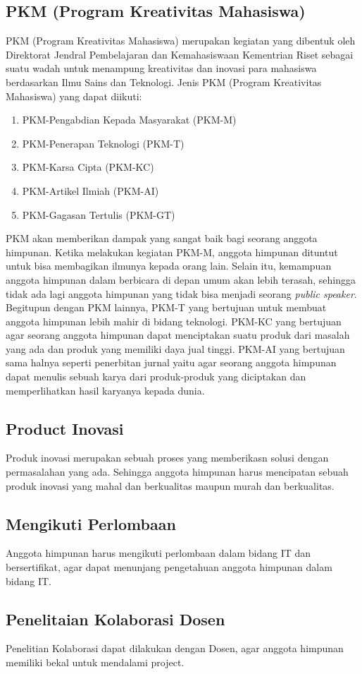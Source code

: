 \subsection{PKM (Program Kreativitas Mahasiswa)}
\par
PKM (Program Kreativitas Mahasiswa) merupakan kegiatan yang dibentuk oleh Direktorat Jendral Pembelajaran dan Kemahasiswaan Kementrian Riset sebagai suatu wadah untuk menampung kreativitas dan inovasi para mahasiswa berdasarkan Ilmu Sains dan Teknologi.
Jenis PKM (Program Kreativitas Mahasiswa) yang dapat diikuti:
\begin{enumerate}
 \item PKM-Pengabdian Kepada Masyarakat (PKM-M)
 \item PKM-Penerapan Teknologi (PKM-T)
 \item PKM-Karsa Cipta (PKM-KC)
 \item PKM-Artikel Ilmiah (PKM-AI)
 \item PKM-Gagasan Tertulis (PKM-GT)
\end{enumerate}
\par
PKM akan memberikan dampak yang sangat baik bagi seorang anggota himpunan. Ketika melakukan kegiatan PKM-M, anggota himpunan dituntut untuk bisa membagikan ilmunya kepada orang lain. Selain itu, kemampuan anggota himpunan dalam berbicara di depan umum akan lebih terasah, sehingga tidak ada lagi anggota himpunan yang tidak bisa menjadi seorang \textit{public speaker}. Begitupun dengan PKM lainnya, PKM-T yang bertujuan untuk membuat anggota himpunan lebih mahir di bidang teknologi. PKM-KC yang bertujuan agar seorang anggota himpunan dapat menciptakan suatu produk dari masalah yang ada dan produk yang memiliki daya jual tinggi. PKM-AI yang bertujuan sama halnya seperti penerbitan jurnal yaitu agar seorang anggota himpunan dapat menulis sebuah karya dari produk-produk yang diciptakan dan memperlihatkan hasil karyanya kepada dunia.

\subsection{Product Inovasi}
\par
Produk inovasi merupakan sebuah proses yang memberikasn solusi dengan permasalahan yang ada. Sehingga anggota himpunan harus mencipatan sebuah produk inovasi yang mahal dan berkualitas maupun murah dan berkualitas. 

\subsection{Mengikuti Perlombaan}
\par
Anggota himpunan harus mengikuti perlombaan dalam bidang IT dan bersertifikat, agar dapat menunjang pengetahuan anggota himpunan dalam bidang IT.

\subsection{Penelitaian Kolaborasi Dosen}
\par
Penelitian Kolaborasi dapat dilakukan dengan Dosen, agar anggota himpunan memiliki bekal untuk mendalami project.